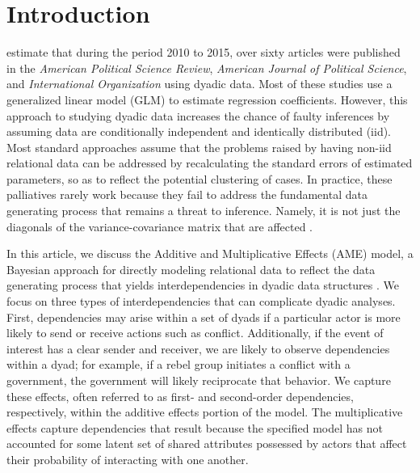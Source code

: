 \section{\textbf{Introduction}}

\citet{aronow:etal:2015} estimate that during the period 2010 to 2015, over sixty articles were published in the \textit{American Political Science Review}, \textit{American Journal of Political Science}, and \textit{International Organization} using dyadic data. Most of these studies use a generalized linear model (GLM) to estimate regression coefficients.  However, this approach to studying dyadic data increases the chance of faulty inferences by assuming data are conditionally independent and identically distributed (iid). Most standard approaches assume that the problems raised by having non-iid relational data can be addressed by recalculating the standard errors of estimated parameters, so as to reflect the potential clustering of cases. In practice, these palliatives rarely work because they fail to address the fundamental data generating process that remains a threat to inference. Namely, it is not just the diagonals of the variance-covariance matrix that are affected \citep{beck:2012, king:roberts:2014}.

In this article, we discuss the Additive and Multiplicative Effects (AME) model, a Bayesian approach for directly modeling relational data to reflect the data generating process that yields interdependencies in dyadic data structures \citep{hoff:2008,minhas:etal:2016:arxiv}. We focus on three types of interdependencies that can complicate dyadic analyses. First, dependencies may arise within a set of dyads if a particular actor is more likely to send or receive actions such as conflict. Additionally, if the event of interest has a clear sender and receiver, we are likely to observe dependencies within a dyad; for example, if a rebel group initiates a conflict with a government, the government will likely reciprocate that behavior. We capture these effects, often referred to as first- and second-order dependencies, respectively, within the additive effects portion of the model. The multiplicative effects capture dependencies that result because the specified model has not accounted for some latent set of shared attributes possessed by actors that affect their probability of interacting with one another. 

